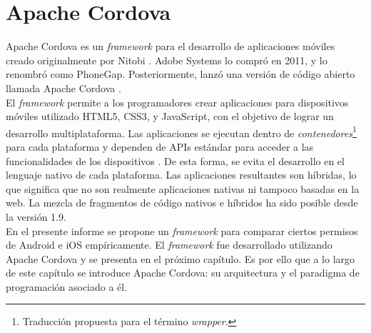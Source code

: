 \chapter{Apache Cordova}
Apache Cordova es un \emph{framework} para el desarrollo de aplicaciones móviles creado originalmente por Nitobi \cite{PBGP}. Adobe Systems lo compró en 2011, y lo renombró como PhoneGap. Posteriormente, lanzó una versión de código abierto llamada Apache Cordova \cite{ACO}.\\

El \emph{framework} permite a los programadores crear aplicaciones para dispositivos móviles utilizado HTML5, CSS3, y JavaScript, con el objetivo de lograr un desarrollo multiplataforma. Las aplicaciones se ejecutan dentro de \emph{contenedores}\footnote{Traducción propuesta para el término \emph{wrapper}.} para cada plataforma y dependen de APIs estándar para acceder a las funcionalidades de los dispositivos \cite{ACO}. De esta forma, se evita el desarrollo en el lenguaje nativo de cada plataforma. Las aplicaciones resultantes son híbridas, lo que significa que no son realmente aplicaciones nativas ni tampoco basadas en la web. La mezcla de fragmentos de código nativos e híbridos ha sido posible desde la versión 1.9.\\

En el presente informe se propone un \emph{framework} para comparar ciertos permisos de Android e iOS empíricamente. El \emph{framework} fue desarrollado utilizando Apache Cordova y se presenta en el próximo capítulo. Es por ello que a lo largo de este capítulo se introduce Apache Cordova: su arquitectura y el paradigma de programación asociado a él.
